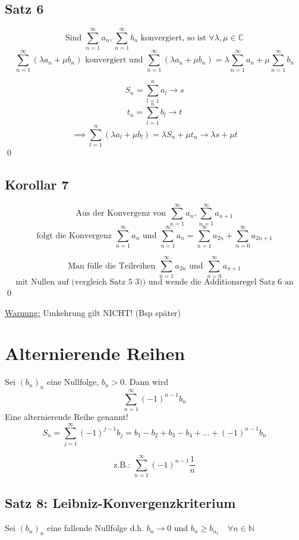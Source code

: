 \documentclass[fleqn]{scrbook}
\newcommand{\N}{\mathbb{N}}
\newcommand{\sumNI}{\sum_{n=0}^{\infty}}
\newcommand{\sumOI}{\sum_{n=1}^{\infty}}
\renewenvironment{proof}{{\bfseries Beweis }}{\qed}
\begin{document}
\subsection{Satz 6}

\[\text{Sind } \sumOI a_n, \sumOI b_n \text{  konvergiert, so ist } \forall \lambda, \mu \in \mathbb{C}\]
\[\sumOI (\lambda a_n + \mu b_n) \text{ konvergiert  und } \sumOI (\lambda a_n + \mu b_n) = \lambda \sumOI a_n + \mu \sumOI b_n \]

\begin{proof}
  \[S_n = \sum_{l=1}^n a_l \to s\]
  \[t_n = \sum_{l=1}^n b_l \to t\]
  \[\implies \sum_{l=1}^n (\lambda a_l + \mu b_l) = \lambda S_n + \mu t_n \to \lambda s + \mu t\]
\end{proof}

\subsection{Korollar 7}

\[\text{Aus der Konvergenz von } \sumOI a_n, \sumOI a_{n+1}\]
\[\text{folgt die Konvergenz } \sumOI a_n
\text{ und } \sumOI a_n = \sumOI a_{2n} + \sumNI a_{2n+1}\]

\begin{proof}
  \[\text{Man fülle die Teilreihen } \sumOI a_{2n} \text{ und } \sumNI a_{n+1}\]
  \[\text{mit Nullen auf (vergleich Satz 5 3)) und wende die Additionsregel Satz 6 an}\] 
\end{proof}

\underline{Warnung:} Umkehrung gilt NICHT! (Bsp später)

\section{Alternierende Reihen}

Sei $(b_n)_n$ eine Nullfolge, $b_n > 0$. Dann wird
\[\sumOI (-1)^{n-1} b_n\]
Eine alternierende Reihe genannt!
\[S_n = \sum_{j=1}^\infty (-1)^{j-1} b_j = b_1-b_2+b_3-b_4+\ldots+(-1)^{n-1} b_n\]

\[\text{z.B.: } \sumOI (-1)^{n-1} \frac{1}{n}\]

\subsection{Satz 8: Leibniz-Konvergenzkriterium}

Sei $(b_n)_n$ eine fallende Nullfolge d.h. $b_n \to 0$ und $b_n \geq b_{n_1} \quad \forall n \in \N$ 
\end{document}
